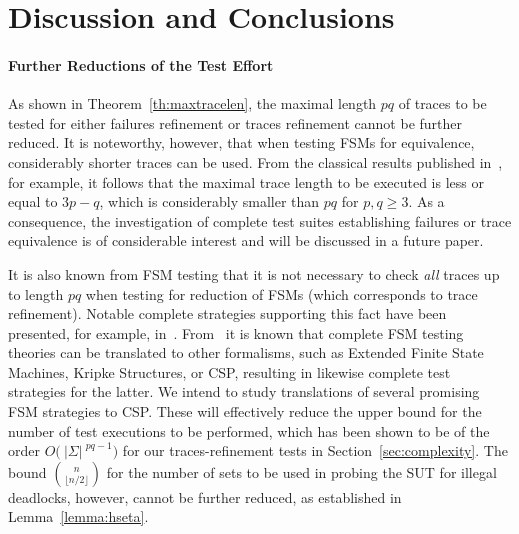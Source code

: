 \documentclass[3p,times]{elsarticle}
\newcommand{\card}[1]{{~|\! #1\!|~}}
\begin{document}


\section{Discussion and Conclusions}
\label{sec:conc}

\paragraph{Further Reductions of the Test Effort} As shown in
Theorem~\ref{th:maxtracelen}, the maximal length $pq$ of traces to be tested
for either  failures refinement or traces refinement cannot be further
reduced. It is noteworthy, however, that when testing FSMs for equivalence,
considerably shorter traces can be used. From the classical results published
in~\cite{chow:wmethod,vasilevskii1973}, for example, it follows that the
maximal trace length to be executed is less or equal to $3p -q$, which is
considerably smaller than $pq$ for $p,q\ge 3$. As a consequence, the
investigation of complete test suites establishing failures or trace
equivalence is of considerable interest and will be discussed in a future
paper.


It is also known from FSM testing that it is not necessary to check {\it all}
traces up to length $pq$ when testing for reduction of FSMs (which
corresponds to trace refinement). Notable complete strategies supporting this
fact have been presented, for example,
in~\cite{hierons_testing_2004,DBLP:conf/forte/DorofeevaEY05,petrenko_testing_2011,simao_reducing_2012}.
From~\cite{Huang2017} it is known that complete FSM testing theories can be
translated to other formalisms, such as Extended Finite State Machines,
Kripke Structures, or CSP, resulting in likewise complete test strategies for
the latter. We intend to study translations of several promising FSM
strategies to CSP. These will effectively reduce the upper bound for the
number of test executions to be performed, which  has been shown to be of the
order $O\big(\card{\Sigma}^{pq-1}\big)$ for our traces-refinement tests in
Section~\ref{sec:complexity}.  The bound $\binom{n}{\lfloor n/2\rfloor}$ for
the number of sets to be used in probing the SUT for illegal deadlocks,
however, cannot be further reduced, as established in
Lemma~\ref{lemma:hseta}.
\end{document}

